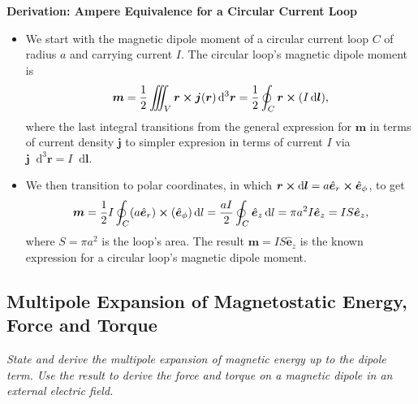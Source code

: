 \documentclass[11pt, a4paper]{article}
\newcommand{\diff}{\mathop{}\!\mathrm{d}} %
\newcommand{\dr}{\diff^{3} \r}  %
\renewcommand{\vec}[1]{\bm{#1}} %
\newcommand{\uvec}[1]{\hat{\vec{#1}}} %
\renewcommand{\r}{\vec{r}}
\newcommand{\m}{\vec{m}}  %
\renewcommand{\j}{\vec{j}}  %
\begin{document}
\textbf{Derivation: Ampere Equivalence for a Circular Current Loop}
\begin{itemize}
	\item We start with the magnetic dipole moment of a circular current loop $ C $ of radius $ a $ and carrying current $ I $. The circular loop's magnetic dipole moment is
	\begin{equation*}
		\m = \frac{1}{2}\iiint_{V}\r \cross \j(\r)\dr =  \frac{1}{2}\oint_{C} \r \cross (I \diff \vec{l}),
	\end{equation*}
    where the last integral transitions from the general expression for $ \m $ in terms of current density $ \j $ to simpler expresion in terms of current $ I $ via $ \j \dr = I \diff \vec{l} $.

    \item We then transition to polar coordinates, in which $ \vec{r} \cross \diff \vec{l} = a \uvec{e}_{r} \cross \uvec{e}_{\phi} $, to get
	\begin{equation*}
		\m = \frac{1}{2}I\oint_{C} (a \uvec{e}_{r}) \cross  (\uvec{e}_{\phi})\diff l = \frac{aI}{2} \oint_{C} \uvec{e}_{z} \diff l = \pi a^{2}I \uvec{e}_{z} = IS\uvec{e}_{z},
	\end{equation*}
    where $ S = \pi a^{2} $ is the loop's area. The result $ \m = I S \uvec{e}_{z} $ is the known expression for a circular loop's magnetic dipole moment.
	
\end{itemize}
    
\subsection{Multipole Expansion of Magnetostatic Energy, Force and Torque}
\textit{State and derive the multipole expansion of magnetic energy up to the dipole term. Use the result to derive the force and torque on a magnetic dipole in an external electric field.}
    
\end{document}
